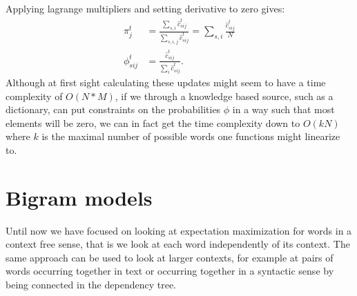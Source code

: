 Applying lagrange multipliers and setting derivative to zero gives:
\begin{equation*}
\begin{split}
\pi^t_j &= \frac{\sum_{s,i}\hat c^t_{sij}}
{\sum_{s,i,j} \hat c^t_{sij}}
= \sum_{s,i}\frac{\hat c^t_{sij}}
{N}\\
\phi_{sij}^t &= 
\frac{\hat c^t_{sij}}
{\sum_{i} \hat c^t_{sij}}.
\end{split}
\end{equation*}
Although at first sight calculating these updates might seem to have a time complexity of $O(N*M)$, if we through a knowledge based source, such as a dictionary, can put constraints on the probabilities $\phi$ in a way such that most elements will be zero, we can in fact get the time complexity down to $O(kN)$ where $k$ is the maximal number of possible words one functions might linearize to.

\section{Bigram models}
Until now we have focused on looking at expectation maximization for words in a context free sense, that is we look at each word independently of its context. The same approach can be used to look at larger contexts, for example at pairs of words occurring together in text or occurring together in a syntactic sense by being connected in the dependency tree.